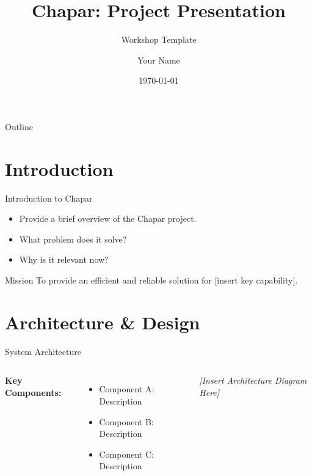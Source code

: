 \documentclass[aspectratio=169]{beamer}
\title[Chapar Project]{Chapar: Project Presentation}
\subtitle{Workshop Template}
\author[Author Name]{Your Name}
\institute[Institution]{Your Institution or Organization \\ \medskip \textit{your.email@example.com}}
\date{\today}
\begin{document}
\begin{frame}
    \titlepage
\end{frame}

\begin{frame}{Outline}
    \tableofcontents
\end{frame}

\section{Introduction}

\begin{frame}{Introduction to Chapar}
    \begin{itemize}
        \item Provide a brief overview of the Chapar project.
        \item What problem does it solve?
        \item Why is it relevant now?
    \end{itemize}
    \vspace{0.5cm}
    \begin{block}{Mission}
        To provide an efficient and reliable solution for [insert key capability].
    \end{block}
\end{frame}

\section{Architecture \& Design}

\begin{frame}{System Architecture}
    \begin{columns}
        \textbf{Key Components:}
        \begin{itemize}
            \item Component A: Description
            \item Component B: Description
            \item Component C: Description
        \end{itemize}
        
        \begin{center}
            \textit{[Insert Architecture Diagram Here]}
        \end{center}
    \end{columns}
\end{frame}
\end{document}
